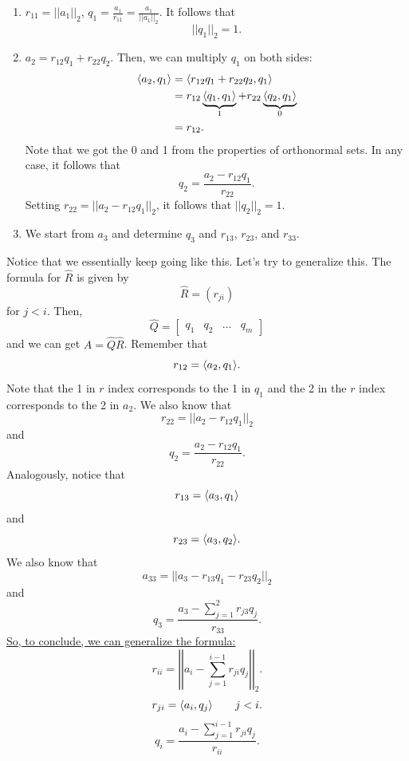 \documentclass[letterpaper]{article}
\newcommand{\0}{\mathbf{0}}
\begin{document}
\begin{enumerate}
    \item $r_{11} = ||a_1||_2$, $q_1 = \frac{a_1}{r_{11}} = \frac{a_1}{||a_1||_2}$. It follows that \[||q_1||_2 = 1.\]
    \item $a_2 = r_{12}q_1 + r_{22}q_2$. Then, we can multiply $q_1$ on both sides: 
    \begin{equation*}
        \begin{aligned}
            \langle a_2, q_1 \rangle &= \langle r_{12}q_1 + r_{22}q_2, q_1 \rangle \\ 
                &= r_{12}\underbrace{\langle q_1, q_1 \rangle}_{1} + r_{22} \underbrace{\langle q_2, q_1 \rangle}_{0} \\ 
                &= r_{12}.
        \end{aligned}
    \end{equation*}
    Note that we got the 0 and 1 from the properties of orthonormal sets. In any case, it follows that \[q_2 = \frac{a_2 - r_{12}q_1}{r_{22}}.\]
    Setting $r_{22} = ||a_2 - r_{12}q_1||_2$, it follows that $||q_2||_2 = 1$. 

    \item We start from $a_3$ and determine $q_3$ and $r_{13}$, $r_{23}$, and $r_{33}$. 
\end{enumerate}
Notice that we essentially keep going like this. Let's try to generalize this. The formula for $\hat{R}$ is given by 
\[\hat{R} = (r_{ji})\]
for $j < i$. Then, \[\hat{Q} = \begin{bmatrix}
    q_1 & q_2 & \hdots & q_m
\end{bmatrix}\] and we can get $A = \hat{Q} \hat{R}$. Remember that 
\[r_{12} = \langle a_2, q_1 \rangle.\] Note that the 1 in $r$ index corresponds to the 1 in $q_1$ and the 2 in the $r$ index corresponds to the 2 in $a_2$. We also know that 
\[r_{22} = ||a_2 - r_{12}q_1||_2\] and 
\[q_2 = \frac{a_2 - r_{12}q_1}{r_{22}}.\]
Analogously, notice that 
\[r_{13} = \langle a_3, q_1 \rangle\] and \[r_{23} = \langle a_3, q_2 \rangle.\] We also know that \[a_{33} = ||a_3 - r_{13}q_1 - r_{23}q_2||_2\] and \[q_3 = \frac{a_3 - \sum_{j = 1}^{2} r_{j3} q_j}{r_{33}}.\] 
\underline{So, to conclude, we can generalize the formula:}
\[r_{ii} = \left|\left| a_{i} - \sum_{j = 1}^{i - 1} r_{ji} q_j \right|\right|_2.\]
\[r_{ji} = \langle a_i, q_j \rangle \qquad j < i.\]
\[q_i = \frac{a_i - \sum_{j = 1}^{i - 1} r_{ji} q_j}{r_{ii}}.\]
\end{document}
